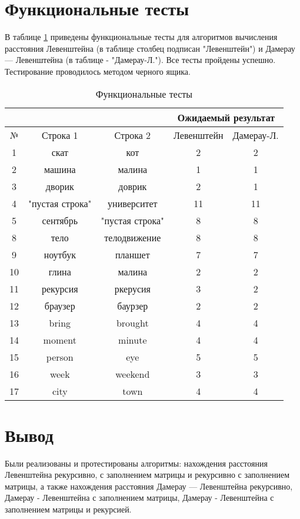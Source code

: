 \section{Функциональные тесты}
В таблице \ref{tabular:functional_test} приведены функциональные тесты для алгоритмов вычисления расстояния Левенштейна (в таблице столбец подписан "Левенштейн") и Дамерау — Левенштейна (в таблице - "Дамерау-Л."). Все тесты пройдены успешно.
Тестирование проводилось методом черного ящика.


\begin{table}[h!]
	\centering
	\begin{center}
		\begin{threeparttable}
		\caption{\label{tabular:functional_test} Функциональные тесты}
		\begin{tabular}{|c|c|c|c|c|}
			\hline
			& & & \multicolumn{2}{c|}{Ожидаемый результат} \\
			\hline
			№&Строка 1&Строка 2&Левенштейн&Дамерау-Л. \\
			\hline
			1&скат&кот&2&2 \\
			\hline
			2&машина&малина&1&1 \\
			\hline
			3&дворик&доврик&2&1 \\
			\hline
			4&"пустая строка"&университет&11&11 \\
			\hline
			5&сентябрь&"пустая строка"&8&8 \\
			\hline
			8&тело&телодвижение&8&8 \\
			\hline
			9&ноутбук&планшет&7&7 \\
			\hline
			10&глина&малина&2&2 \\
			\hline
			11&рекурсия&ркерусия&3&2 \\
			\hline
			12&браузер&баурзер&2&2 \\
			\hline
			13&bring&brought&4&4 \\
			\hline
			14&moment&minute&4&4 \\ 
			\hline
			15&person&eye&5&5 \\
			\hline
			16&week&weekend&3&3 \\
			\hline 
			17&city&town&4&4 \\
			\hline
		\end{tabular}
		\end{threeparttable}
	\end{center}
\end{table}


\section*{Вывод}

Были реализованы и протестированы алгоритмы: нахождения расстояния Левенштейна рекурсивно, с заполнением матрицы и рекурсивно с заполнением матрицы, а также нахождения расстояния Дамерау — Левенштейна рекурсивно, Дамерау - Левенштейна с заполнением матрицы, Дамерау - Левенштейна с заполнением матрицы и рекурсией.
